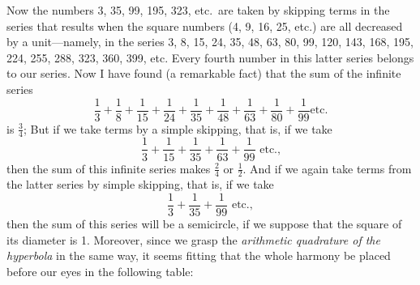 \documentclass[twoside,openright]{article}
\begin{document}
\noindent Now the numbers 3, 35, 99, 195, 323, etc.\ are taken by
skipping terms in the series that results when the square numbers (4,
9, 16, 25, etc.) are all decreased by a unit---namely, in the series
3, 8, 15, 24, 35, 48, 63, 80, 99, 120, 143, 168, 195, 224, 255, 288,
323, 360, 399, etc. Every fourth number in this latter series belongs
to our series.  Now I have found (a remarkable fact) that the sum of
the infinite series
$$\frac{1}{3} +
\frac{1}{8} + \frac{1}{15} + \frac{1}{24} + \frac{1}{35} +
\frac{1}{48} + \frac{1}{63} + \frac{1}{80} + \frac{1}{99}\mbox{
  etc.}$$ is $\frac{3}{4}$;
But if we take terms by a simple skipping, that is, if we take
$$\frac{1}{3} + \frac{1}{15} +
\frac{1}{35} + \frac{1}{63} + \frac{1}{99}\mbox{ etc.,}$$ then the sum
of this infinite series makes $\frac{2}{4}$ or
$\frac{1}{2}$. And if we again
take terms from the latter series by simple skipping, that is, if we
take
  $$\frac{1}{3} + \frac{1}{35} + \frac{1}{99}\mbox{ etc.},$$ 
  then the sum of this series will be a semicircle, if we suppose that
  the square of its diameter is 1.  Moreover, since we grasp the {\em
    arithmetic quadrature of the hyperbola} in the same way, it seems
  fitting that the whole harmony be placed before our eyes in the
  following table: \vspace{1.25ex}
  
\end{document}
